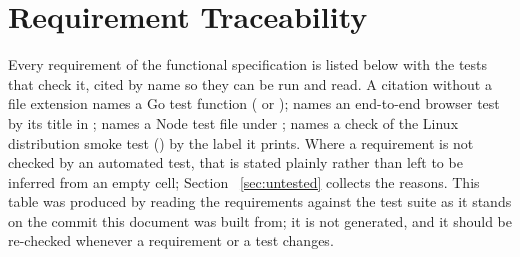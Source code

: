 \section{Requirement Traceability}
\label{sec:traceability}

Every requirement of the functional specification is listed below with the tests
that check it, cited by name so they can be run and read.  A citation without a
file extension names a Go test function ( or
);  names an end-to-end browser test by its
title in ;  names a Node test file under
;  names a check of the Linux distribution smoke test
() by the label it prints.  Where a requirement is not checked by an automated test, that
is stated plainly rather than left to be inferred from an empty cell; Section~
\ref{sec:untested} collects the reasons.  This table was produced by reading the
requirements against the test suite as it stands on the commit this document was
built from; it is not generated, and it should be re-checked whenever a requirement
or a test changes.


